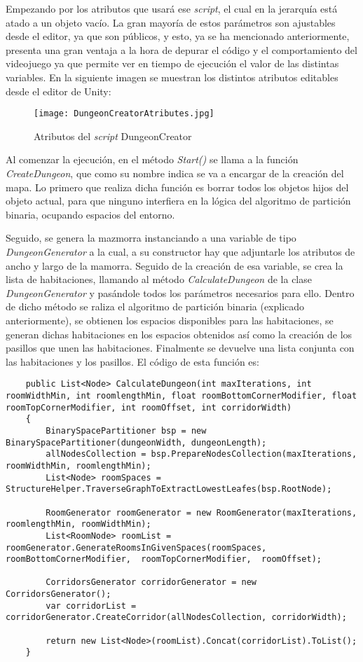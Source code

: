 Empezando por los atributos que usará ese \textit{script}, el cual en la jerarquía está atado a un objeto vacío. La gran mayoría de estos parámetros son ajustables desde el editor, ya que son públicos, y esto, ya se ha mencionado anteriormente, presenta una gran ventaja a la hora de depurar el código y el comportamiento del videojuego ya que permite ver en tiempo de ejecución el valor de las distintas variables. En la siguiente imagen se muestran los distintos atributos editables desde el editor de Unity: 

\begin{figure}[H]
    \centering
    \texttt{[image: DungeonCreatorAtributes.jpg]}
    \caption{Atributos del \textit{script} DungeonCreator}
\end{figure}

Al comenzar la ejecución, en el método \textit{Start()} se llama a la función \textit{CreateDungeon}, que como su nombre indica se va a encargar de la creación del mapa. Lo primero que realiza dicha función es borrar todos los objetos hijos del objeto actual, para que ninguno interfiera en la lógica del algoritmo de partición binaria, ocupando espacios del entorno. 

Seguido, se genera la mazmorra instanciando a una variable de tipo \textit{DungeonGenerator} a la cual, a su constructor hay que adjuntarle los atributos de ancho y largo de la mamorra. Seguido de la creación de esa variable, se crea la lista de habitaciones, llamando al método \textit{CalculateDungeon} de la clase \textit{DungeonGenerator} y pasándole todos los parámetros necesarios para ello. Dentro de dicho método se raliza el algoritmo de partición binaria (explicado anteriormente), se obtienen los espacios disponibles para las habitaciones, se generan dichas habitaciones en los espacios obtenidos así como la creación de los pasillos que unen las habitaciones. Finalmente se devuelve una lista conjunta con las habitaciones y los pasillos. El código de esta función es:

\begin{lstlisting}
    public List<Node> CalculateDungeon(int maxIterations, int roomWidthMin, int roomlengthMin, float roomBottomCornerModifier, float roomTopCornerModifier, int roomOffset, int corridorWidth)
    {
        BinarySpacePartitioner bsp = new BinarySpacePartitioner(dungeonWidth, dungeonLength);
        allNodesCollection = bsp.PrepareNodesCollection(maxIterations, roomWidthMin, roomlengthMin);
        List<Node> roomSpaces = StructureHelper.TraverseGraphToExtractLowestLeafes(bsp.RootNode);

        RoomGenerator roomGenerator = new RoomGenerator(maxIterations, roomlengthMin, roomWidthMin);
        List<RoomNode> roomList = roomGenerator.GenerateRoomsInGivenSpaces(roomSpaces,  roomBottomCornerModifier,  roomTopCornerModifier,  roomOffset);

        CorridorsGenerator corridorGenerator = new CorridorsGenerator();
        var corridorList = corridorGenerator.CreateCorridor(allNodesCollection, corridorWidth);

        return new List<Node>(roomList).Concat(corridorList).ToList();
    }
\end{lstlisting}

